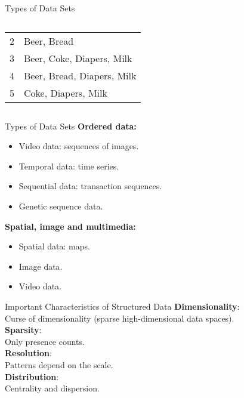 \begin{frame}{Types of Data Sets}
\begin{columns}
\begin{column}{0.45\textwidth}
\begin{table}
\begin{tabular} { | c | l |}
          2 & Beer, Bread\\
          3 & Beer, Coke, Diapers, Milk\\
          4 & Beer, Bread, Diapers, Milk\\
          5 & Coke, Diapers, Milk \\
          \hline
        \end{tabular}
      \end{table}
    \end{column}
  \end{columns}
\end{frame}

\begin{frame}{Types of Data Sets}
  \textbf{Ordered data:}
  \begin{itemize}[noitemsep]
  \item Video data: sequences of images.
  \item Temporal data: time series.
  \item Sequential data: transaction sequences.
  \item Genetic sequence data.
  \end{itemize}
  \textbf{Spatial, image and multimedia:}
  \begin{itemize}[noitemsep]
  \item Spatial data: maps.
  \item Image data.
  \item Video data.
  \end{itemize}
\end{frame}

\begin{frame}{Important Characteristics of Structured Data}
  \textbf{Dimensionality}:\\
  Curse of dimensionality (sparse high-dimensional data spaces).\\[0.2cm]

  \textbf{Sparsity}:\\
  Only presence counts.\\[0.2cm]

  \textbf{Resolution}:\\
  Patterns depend on the scale.\\[0.2cm]

  \textbf{Distribution}:\\
  Centrality and dispersion.
\end{frame}

